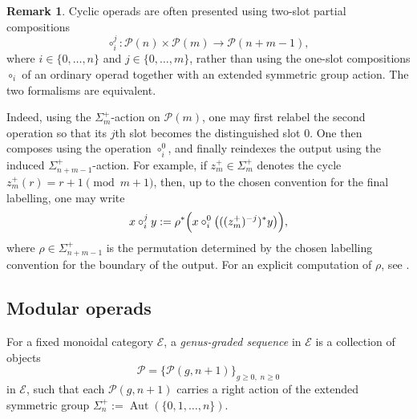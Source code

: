 \documentclass{amsart}
\newcommand{\bE}{\mathscr{E}}
\newcommand{\calP}{\mathcal{P}}
\newcommand{\Aut}{\operatorname{Aut}}
\theoremstyle{definition}
\newtheorem{remark}[theorem]{Remark}%
\numberwithin{equation}{section}
\begin{document}
\begin{remark}\label{rmk:reduce-circij}
Cyclic operads are often presented using two-slot partial compositions
\[
\circ_i^j:\calP(n)\times \calP(m)\longrightarrow \calP(n+m-1),
\]
where $i\in\{0,\ldots,n\}$ and $j\in\{0,\ldots,m\}$, rather than using the one-slot compositions $\circ_i$ of an ordinary operad together with an extended
symmetric group action. The two formalisms are equivalent.

Indeed, using the $\Sigma_m^+$-action on $\calP(m)$, one may first relabel the second operation so that its $j$th slot becomes the distinguished slot $0$.
One then composes using the operation $\circ_i^0$, and finally reindexes the output using the induced $\Sigma_{n+m-1}^+$-action. For example, if
$z_m^+\in\Sigma_m^+$ denotes the cycle $z_m^+(r)=r+1\pmod{m+1}$, then, up to the chosen convention for the final labelling, one may write
\[
x\circ_i^j y
:= \rho^*\Bigl(x\circ_i^0 \bigl(((z_m^+)^{-j})^*y\bigr)\Bigr),
\]
where $\rho\in\Sigma_{n+m-1}^+$ is the permutation determined by the chosen labelling convention for the boundary of the output. For an explicit computation
of $\rho$, see \cite{DCH}.
\end{remark}

\subsection{Modular operads}\label{sec: modular operads}
For a fixed monoidal category $\bE$, a \emph{genus-graded sequence} in $\bE$ is a collection of objects
\[
\calP=\{\calP(g,n+1)\}_{g\ge 0,\; n\ge 0}
\]
in $\bE$, such that each $\calP(g,n+1)$ carries a right action of the extended symmetric group $\Sigma_n^+ := \Aut(\{0,1,\ldots,n\})$.
\end{document}
